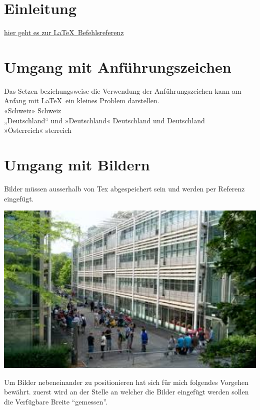 \section{Einleitung}


\href{https://golatex.de/wiki/Kategorie:Befehlsreferenz}{hier geht es zur \LaTeX\ Befehlsreferenz}

\section{Umgang mit Anführungszeichen}
Das Setzen beziehungsweise die Verwendung der Anführungszeichen kann am Anfang mit \LaTeX\ ein kleines Problem darstellen.\\
\noindent
«Schweiz» 	\frqq Schweiz\flqq \\
„Deutschland“ und »Deutschland«	  	\glqq Deutschland\grqq{} und \flqq Deutschland\frqq \\
»Österreich« 	sterreich\frqq

\section{Umgang mit Bildern}
Bilder müssen ausserhalb von Tex abgespeichert sein und werden per Referenz eingefügt.

\noindent
\begin{minipage}{1.0\textwidth}
 	\centering
 	\includegraphics[width=1.0\textwidth]{Kapitel/Bilder/gibbBmSchulhausMitSchuelern}
\end{minipage}

Um Bilder nebeneinander zu positionieren hat sich für mich folgendes Vorgehen bewährt. zuerst wird an der Stelle an welcher die Bilder eingefügt werden sollen die Verfügbare Breite "`gemessen"'.

